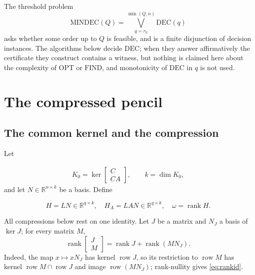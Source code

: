 \documentclass[journal]{IEEEtran}
\theoremstyle{plainn}
\begin{document}
The threshold problem
\begin{equation}\label{eq:mindec}
\mathrm{MINDEC}(Q)=\bigvee_{q=r_0}^{\min(Q,n)}\mathrm{DEC}(q)
\end{equation}
asks whether some order up to $Q$ is feasible, and is a finite disjunction of decision
instances. The algorithms below decide $\mathrm{DEC}$; when they answer affirmatively the
certificate they construct contains a witness, but nothing is claimed here about the
complexity of $\mathrm{OPT}$ or $\mathrm{FIND}$, and monotonicity of $\mathrm{DEC}$ in $q$
is not used.

\section{The compressed pencil}\label{sec:compressed}

\subsection{The common kernel and the compression}\label{sec:compress}
Let

\begin{equation}
\begin{gathered}
K_0=\ker\begin{bmatrix}C\\ CA\end{bmatrix},\qquad k=\dim K_0,
\end{gathered}
\end{equation}
and let $N\in\mathbb R^{n\times k}$ be a basis. Define

\begin{equation}
H=LN\in\mathbb R^{q\times k},\quad H_A=LAN\in\mathbb R^{q\times k},\quad
\omega=\operatorname{rank}H.
\end{equation}

All compressions below rest on one identity. Let $J$ be a matrix and $N_J$ a basis of
$\ker J$; for every matrix $M$,
\begin{equation}\label{eq:rankid}
\operatorname{rank}\begin{bmatrix}J\\M\end{bmatrix}
=\operatorname{rank}J+\operatorname{rank}(MN_J).
\end{equation}
Indeed, the map $x\mapsto xN_J$ has kernel $\operatorname{row}J$, so its restriction to
$\operatorname{row}M$ has kernel $\operatorname{row}M\cap\operatorname{row}J$ and image
$\operatorname{row}(MN_J)$; rank-nullity gives \eqref{eq:rankid}.
\end{document}
